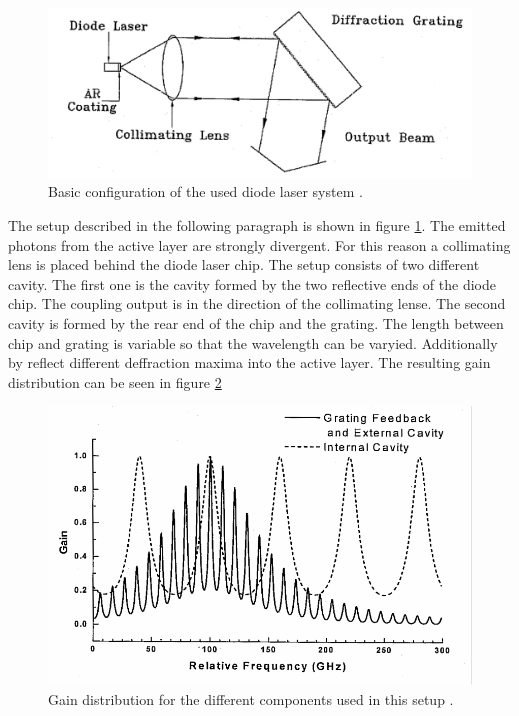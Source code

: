 \begin{figure}
  \centering
  \includegraphics[width = \textwidth]{Pics/setup.png}
  \caption{Basic configuration of the used diode laser system \cite{anleitung}.}
  \label{fig:setup}
\end{figure}
The setup described in the following paragraph is shown in figure \ref{fig:setup}.
The emitted photons from the active layer are strongly divergent. For this reason
a collimating lens is placed behind the diode laser chip. The setup consists of
two different cavity. The first one is the cavity formed by the two reflective ends
of the diode chip. The coupling output is in the direction of the collimating lense.
The second cavity is formed by the rear end of the chip and the grating. The length
between chip and grating is variable so that the wavelength can be varyied. Additionally
by reflect different deffraction maxima into the active layer. The resulting
gain distribution can be seen in figure \ref{fig:gain}
\begin{figure}
  \centering
  \includegraphics[width = \textwidth]{Pics/gain.pdf}
  \caption{Gain distribution for the different components used in this setup \cite{anleitung}.}
  \label{fig:gain}
\end{figure}
